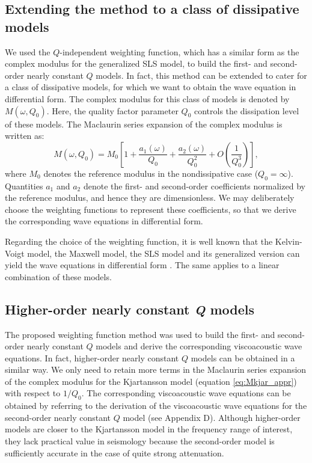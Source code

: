 \documentclass[article]{./macros/elsarticle_qh}
\begin{document}
\subsection{Extending the method to a class of dissipative models}
We used the $Q$-independent weighting function, which has a similar form as the complex modulus for the generalized SLS model, to build the first- and second-order nearly constant $Q$ models. In fact, this method can be extended to cater for a class of dissipative models, for which we want to obtain the wave equation in differential form. The complex modulus for this class of models is denoted by $M(\omega, Q_{0})$. Here, the quality factor parameter $Q_{0}$ controls the dissipation level of these models. 
The Maclaurin series expansion of the complex modulus is written as:
\begin{equation} \label{eq:M_class}
M(\omega,Q_{0})  = M_{0} \left[
1 +  \frac{a_{1}(\omega)}{Q_{0}} +  \frac{a_{2}(\omega)}{Q_{0}^2} + O\left(\frac{1}{Q_{0}^3}\right)
\right] ,
\end{equation}
where $M_{0}$ denotes the reference modulus in the nondissipative case ($Q_{0} = \infty$). Quantities $a_{1}$ and $a_{2}$ denote the first- and second-order coefficients normalized by the reference modulus, and hence they are dimensionless. We may deliberately choose the weighting functions to represent these coefficients, so that we derive the corresponding wave equations in differential form. 

Regarding the choice of the weighting function, it is well known that the Kelvin-Voigt model, the Maxwell model, the SLS model and its generalized version can yield the wave equations in differential form \cite[e.g.,][]{carcione:2014,hao.alkhalifah:2019,hao.greenhalgh:2019}. The same applies to a linear combination of these models. 

\subsection{Higher-order nearly constant \textit{Q} models}  
The proposed weighting function method was used to build the first- and second-order nearly constant $Q$ models and derive the corresponding viscoacoustic wave equations. In fact, higher-order nearly constant $Q$ models can be obtained in a similar way. We only need to retain more terms in the Maclaurin series expansion of the complex modulus for the Kjartansson model (equation \ref{eq:Mkjar_appr}) with respect to $1/Q_{0}$. The corresponding viscoacoustic wave equations can be obtained by referring to the derivation of the viscoacoustic wave equations for the second-order nearly constant $Q$ model (see Appendix D). Although higher-order models are closer to the Kjartansson model in the frequency range of interest, they lack practical value in seismology because the second-order model is sufficiently accurate in the case of quite strong attenuation. 
\end{document}
